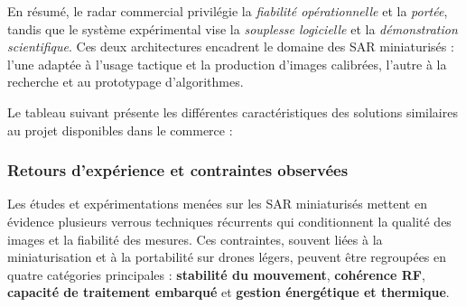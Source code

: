 En résumé, le radar commercial privilégie la \emph{fiabilité opérationnelle} et la \emph{portée}, tandis que le système expérimental vise la \emph{souplesse logicielle} et la \emph{démonstration scientifique}.  
Ces deux architectures encadrent le domaine des SAR miniaturisés : l’une adaptée à l’usage tactique et la production d’images calibrées, l’autre à la recherche et au prototypage d’algorithmes.

\vspace{1em}

Le tableau suivant présente les différentes caractéristiques des solutions similaires au projet disponibles dans le commerce :  

\begin{table}[h!]
\centering
\caption{Comparatif de différents radars SAR embarqués sur drones.}
\label{tab:radars_sar}

\end{table}

\subsubsection{Retours d’expérience et contraintes observées}

Les études et expérimentations menées sur les SAR miniaturisés mettent en évidence plusieurs verrous techniques récurrents qui conditionnent la qualité des images et la fiabilité des mesures.  
Ces contraintes, souvent liées à la miniaturisation et à la portabilité sur drones légers, peuvent être regroupées en quatre catégories principales : \textbf{stabilité du mouvement}, \textbf{cohérence RF}, \textbf{capacité de traitement embarqué} et \textbf{gestion énergétique et thermique}.

